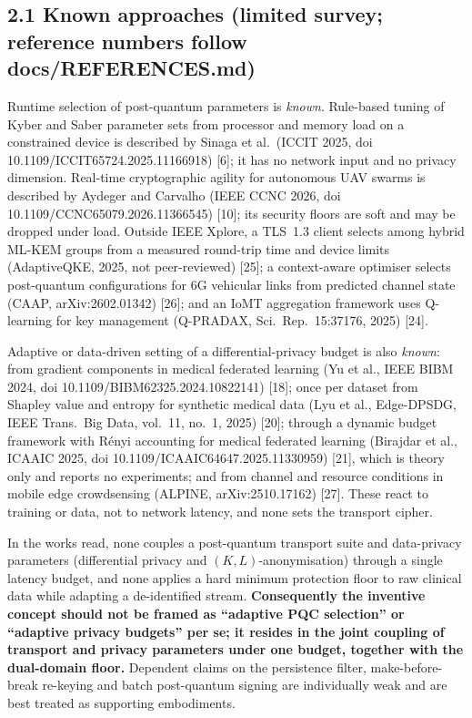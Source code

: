 \documentclass[11pt,a4paper]{article}
\begin{document}
\subsection*{2.1 Known approaches (limited survey; reference numbers follow docs/REFERENCES.md)}
Runtime selection of post-quantum parameters is \emph{known}. Rule-based tuning of Kyber and Saber parameter sets from processor and memory load on a constrained device is described by Sinaga et al.\ (ICCIT 2025, doi 10.1109/ICCIT65724.2025.11166918) [6]; it has no network input and no privacy dimension. Real-time cryptographic agility for autonomous UAV swarms is described by Aydeger and Carvalho (IEEE CCNC 2026, doi 10.1109/CCNC65079.2026.11366545) [10]; its security floors are soft and may be dropped under load. Outside IEEE Xplore, a TLS~1.3 client selects among hybrid ML-KEM groups from a measured round-trip time and device limits (AdaptiveQKE, 2025, not peer-reviewed) [25]; a context-aware optimiser selects post-quantum configurations for 6G vehicular links from predicted channel state (CAAP, arXiv:2602.01342) [26]; and an IoMT aggregation framework uses Q-learning for key management (Q-PRADAX, Sci.\ Rep.\ 15:37176, 2025) [24].

Adaptive or data-driven setting of a differential-privacy budget is also \emph{known}: from gradient components in medical federated learning (Yu et al., IEEE BIBM 2024, doi 10.1109/BIBM62325.2024.10822141) [18]; once per dataset from Shapley value and entropy for synthetic medical data (Lyu et al., Edge-DPSDG, IEEE Trans.\ Big Data, vol.~11, no.~1, 2025) [20]; through a dynamic budget framework with R\'enyi accounting for medical federated learning (Birajdar et al., ICAAIC 2025, doi 10.1109/ICAAIC64647.2025.11330959) [21], which is theory only and reports no experiments; and from channel and resource conditions in mobile edge crowdsensing (ALPINE, arXiv:2510.17162) [27]. These react to training or data, not to network latency, and none sets the transport cipher.

In the works read, none couples a post-quantum transport suite and data-privacy parameters (differential privacy and $(K,L)$-anonymisation) through a single latency budget, and none applies a hard minimum protection floor to raw clinical data while adapting a de-identified stream. \textbf{Consequently the inventive concept should not be framed as ``adaptive PQC selection'' or ``adaptive privacy budgets'' per se; it resides in the joint coupling of transport and privacy parameters under one budget, together with the dual-domain floor.} Dependent claims on the persistence filter, make-before-break re-keying and batch post-quantum signing are individually weak and are best treated as supporting embodiments.
\end{document}
